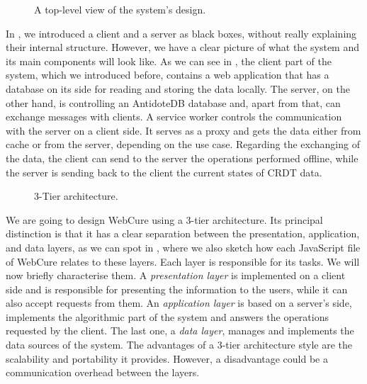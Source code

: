 \begin{figure}[!htb]
    \begin{center}
        \setlength{\fboxsep}{15pt}%
        \setlength{\fboxrule}{1pt}%
    \def\svgwidth{\linewidth}
    \fbox{}
    \caption {A top-level view of the system's design.}
    \label{fig:impl1}
\end{center}
\end{figure}

In , we introduced a client and a server as black boxes, without really explaining their internal structure. However, we have a clear picture of what the system and its main components will look like. As we can see in , the client part of the system, which we introduced before, contains a web application that has a database on its side for reading and storing the data locally. The server, on the other hand, is controlling an AntidoteDB database and, apart from that, can exchange messages with clients. A service worker controls the communication with the server on a client side. It serves as a proxy and gets the data either from cache or from the server, depending on the use case. Regarding the exchanging of the data, the client can send to the server the operations performed offline, while the server is sending back to the client the current states of CRDT data. 

\begin{figure}[!htb]
    \begin{center}
    \def\svgwidth{\linewidth}
    
    \caption {3-Tier architecture.}
    \label{fig:dev1}
\end{center}
\end{figure}

We are going to design WebCure using a 3-tier architecture\cite{51}. Its principal distinction is that it has a clear separation between the presentation, application, and data layers, as we can spot in , where we also sketch how each JavaScript file of WebCure relates to these layers. Each layer is responsible for its tasks. We will now briefly characterise them. A \textit{presentation layer} is implemented on a client side and is responsible for presenting the information to the users, while it can also accept requests from them. An \textit{application layer} is based on a server's side, implements the algorithmic part of the system and answers the operations requested by the client. The last one, a \textit{data layer}, manages and implements the data sources of the system. The advantages of a 3-tier architecture style are the scalability and portability it provides. However, a disadvantage could be a communication overhead between the layers\cite{50}.

